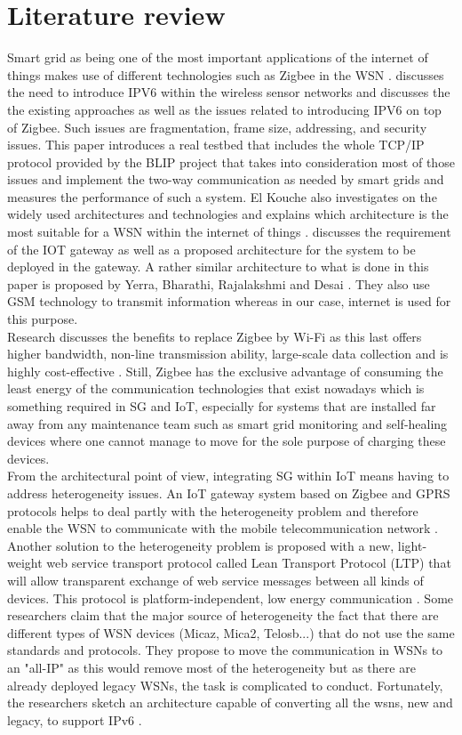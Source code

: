 \documentclass[conference]{IEEEtran}
\begin{document}
\section{Literature review}
Smart grid as being one of the most important applications of the internet of things makes use of different technologies such as Zigbee in the WSN \cite{ref1}.  \cite{ref2} discusses the need to introduce IPV6 within the wireless sensor networks and discusses the the existing approaches as well as the issues related to introducing IPV6 on top of Zigbee. Such issues are fragmentation, frame size, addressing, and security issues. This paper introduces a real testbed that includes the whole TCP/IP protocol provided by the BLIP project that takes into consideration most of those issues and implement the two-way communication as needed by smart grids and measures the performance of such a system. El Kouche also investigates on the widely used architectures and technologies and explains which architecture is the most suitable for a WSN within the internet of things \cite{ref3}. \cite{ref4} discusses the requirement of the IOT gateway as well as a proposed architecture for the system to be deployed in the gateway. A rather similar architecture to what is done in this paper is proposed by Yerra, Bharathi, Rajalakshmi and Desai \cite{ref7}. They also use GSM technology to transmit information whereas in our case, internet is used for this purpose. \\
Research discusses the benefits to replace Zigbee by Wi-Fi as this last offers higher bandwidth, non-line transmission ability, large-scale data collection and is highly cost-effective \cite{ref11}. Still, Zigbee has the exclusive advantage of consuming the least energy of the communication technologies that exist nowadays which is something required in SG and IoT, especially for systems that are installed far away from any maintenance team such as smart grid monitoring and self-healing devices where one cannot manage to move for the sole purpose of charging these devices.  \\
From the architectural point of view, integrating SG within IoT means having to address heterogeneity issues. An IoT gateway system based on Zigbee and GPRS protocols helps to deal partly with the heterogeneity problem and therefore enable the WSN to communicate with the mobile telecommunication network \cite{ref11}. Another solution to the heterogeneity problem is proposed with a new, light-weight web service transport protocol called Lean Transport Protocol (LTP) that will allow transparent exchange of web service messages between all kinds of devices. This protocol is platform-independent, low energy communication \cite{ref12}. Some researchers claim that the major source of heterogeneity the fact that there are different types of WSN devices (Micaz, Mica2, Telosb...) that do not use the same standards and protocols. They propose to move the communication in WSNs to an "all-IP" as this would remove most of the heterogeneity but as there are already deployed legacy WSNs, the task is complicated to conduct. Fortunately, the researchers sketch an architecture capable of converting all the \glspl{wsn}, new and legacy, to support IPv6 \cite{ref13}.
\end{document}
